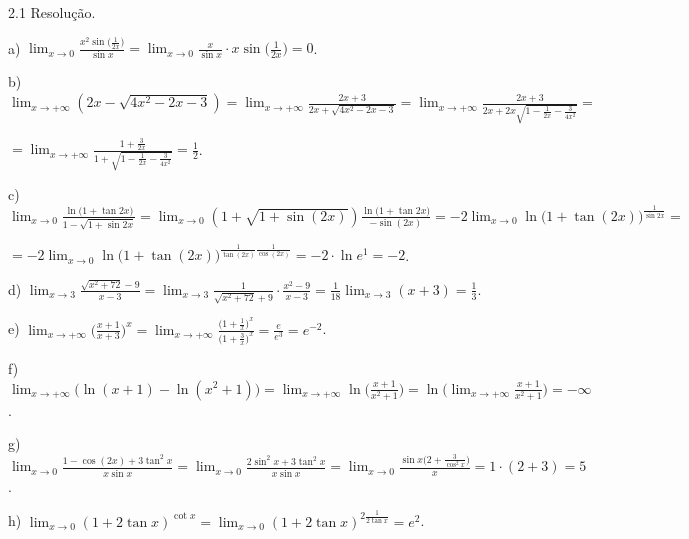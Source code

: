 \documentclass{article}
\begin{document}
{\begin{newpage}
\begin{flushleft}
2.1 Resolução.
\end{flushleft}
\par
a) $\displaystyle{\lim_{x\to 0} \frac{x^{2}\sin{\Big(\frac{1}{2x}\Big)}}{\sin{x}} = \lim_{x\to 0} \frac{x}{\sin{x}}\cdot x\sin{\Big(\frac{1}{2x}\Big)} = 0}$.
\par
\vspace{0.3cm}
b) $\displaystyle{\lim_{x\to +\infty } (2x - \sqrt{4x^2 - 2x - 3}) = \lim_{x\to +\infty } \frac{2x+3}{2x + \sqrt{4x^2 - 2x - 3}} = \lim_{x\to +\infty } \frac{2x+3}{2x + 2x\sqrt{1 - \frac{1}{2x} - \frac{3}{4x^2}}}} =$ \par $= \displaystyle{\lim_{x\to +\infty } \frac{1 + \frac{3}{2x}}{1 + \sqrt{1 - \frac{1}{2x} - \frac{3}{4x^2}}} = \frac{1}{2}}$.
\par
\vspace{0.3cm}
c) $\displaystyle{\lim_{x\to 0} \frac{\ln{(1+\tan{2x}})}{1 - \sqrt{1 + \sin{2x}}} = \lim_{x\to 0} (1 + \sqrt{1 + \sin{(2x)}})\frac{\ln{(1+\tan{2x}})}{-\sin{(2x)}} = -2\lim_{x\to 0} \ln{\Big(1 + \tan{(2x)}\Big)^{\frac{1}{\sin{2x}}}}} =$ \par $= -2\displaystyle{\lim_{x\to 0} \ln{\Big(1 + \tan{(2x)}\Big)^{\frac{1}{\tan{(2x)}}\frac{1}{\cos{(2x)}}}}} = -2\cdot\ln{e^1} = -2$.
\par
\vspace{0.3cm}
d) $\displaystyle{\lim_{x\to 3} \frac{\sqrt{x^2 + 72} - 9}{x-3} = \lim_{x\to 3} \frac{1}{\sqrt{x^2 + 72} + 9}\cdot\frac{x^2 - 9}{x-3} = \frac{1}{18}\lim_{x\to 3} (x+3) = \frac{1}{3}}$.
\par
\vspace{0.3cm}
e) $\displaystyle{\lim_{x\to +\infty } \Big(\frac{x+1}{x+3}\Big)^x = \lim_{x\to +\infty } \frac{\Big(1 + \frac{1}{x}\Big)^x}{\Big(1 + \frac{3}{x}\Big)^x} = \frac{e}{e^3} = e^{-2}}$.
\par
\vspace{0.3cm}
f) $\displaystyle{\lim_{x\to +\infty } \Big(\ln{(x+1)} - \ln{(x^2 + 1)}\Big) = \lim_{x\to +\infty } \ln{\Big(\frac{x+1}{x^2 + 1}\Big)} = \ln{\Big(\lim_{x\to +\infty } \frac{x+1}{x^2 + 1}\Big)} = -\infty }$.
\par
\vspace{0.3cm}
g) $\displaystyle{\lim_{x\to 0} \frac{1 - \cos{(2x)} + 3\tan^{2}{x}}{x\sin{x}} = \lim_{x\to 0} \frac{2\sin^2{x} + 3\tan^{2}{x}}{x\sin{x}} = \lim_{x\to 0} \frac{\sin{x}\Big(2 + \frac{3}{\cos^{2}{x}}\Big)}{x} = 1\cdot (2+3) = 5}$.
\par
\vspace{0.3cm}
h) $\displaystyle{\lim_{x\to 0} (1 + 2\tan{x})^{\cot{x}} = \lim_{x\to 0} (1 + 2\tan{x})^{2\frac{1}{2\tan{x}}} = e^2}$.
\par
\vspace{0.3cm}

\end{newpage}}
\end{document}
